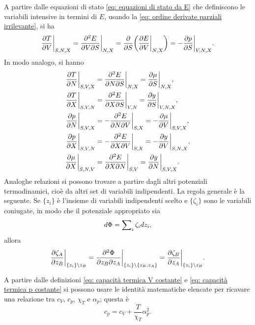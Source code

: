 A partire dalle equazioni di stato \eqref{eq: equazioni di stato da E} che definiscono le variabili intensive in termini di $E$, usando la \eqref{eq: ordine derivate parziali irrilevante}, si ha
\begin{equation}
    \frac{\partial T}{\partial V}\bigg|_{S,N,X} = \frac{\partial^2 E}{\partial V\partial S}\bigg|_{N,X} = \frac{\partial}{\partial S}\bigg(\frac{\partial E}{\partial V}\bigg|_{N,X}\bigg) = -\frac{\partial p}{\partial S}\bigg|_{V,N,X}.
\end{equation}
In modo analogo, si hanno
\begin{align}
    \frac{\partial T}{\partial N}\bigg|_{S,V,X} &= \frac{\partial^2 E}{\partial N\partial S}\bigg|_{N,X} = \frac{\partial\mu}{\partial S}\bigg|_{N,X}, \\
    \frac{\partial T}{\partial X}\bigg|_{S,V,N} &= \frac{\partial^2 E}{\partial X\partial S}\bigg|_{V,N} = \frac{\partial y}{\partial S}\bigg|_{V,N,X}, \\
    \frac{\partial p}{\partial N}\bigg|_{S,V,X} &= -\frac{\partial^2 E}{\partial N\partial V}\bigg|_{S,X} = -\frac{\partial \mu}{\partial V}\bigg|_{S,V,X}, \\
    \frac{\partial p}{\partial X}\bigg|_{S,V,N} &= -\frac{\partial^2 E}{\partial X\partial V}\bigg|_{S,X} = -\frac{\partial y}{\partial V}\bigg|_{S,N,X}, \\
    \frac{\partial \mu}{\partial X}\bigg|_{S,N,V} &= \frac{\partial^2 E}{\partial X\partial N}\bigg|_{S,V} = \frac{\partial y}{\partial N}\bigg|_{S,V,X}.
\end{align}
Analoghe relazioni si possono trovare a partire dagli altri potenziali termodinamici, cioè da altri set di  variabili indipendenti. La regola generale è la seguente. Se $\{z_i\}$ è l'insieme di variabili indipendenti scelto e $\{\zeta_i\}$ sono le variabili coniugate, in modo che il potenziale appropriato sia
\begin{equation}
    d\Phi = \sum\nolimits_i\zeta_idz_i,
\end{equation}
allora
\begin{equation}
    \frac{\partial\zeta_A}{\partial z_B}\bigg|_{\{z_i\}\setminus z_B} = \frac{\partial^2\Phi}{\partial z_B \partial z_A}\bigg|_{\{z_i\}\setminus \{z_B,z_A\}} = \frac{\partial \zeta_B}{\partial z_A}\bigg|_{\{z_i\}\setminus z_B}.
\end{equation}

A partire dalle definizioni \eqref{eq: capacità termica V costante} e \eqref{eq: capacità termica p costante} si possono usare le identità matematiche elencate per ricavare una relazione tra $c_V$, $c_p$, $\chi_T$ e $\alpha_p$; questa è
\begin{equation}
    c_p = c_V + \frac{T}{\chi_T}\alpha_p^2.
\end{equation}



